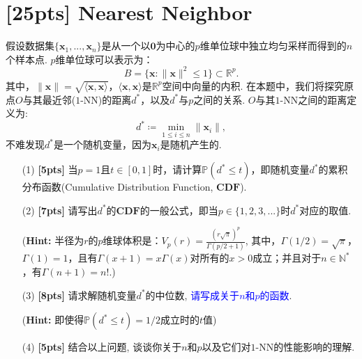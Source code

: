 \documentclass[a4paper,UTF8]{article}
\numberwithin{equation}{section}
\theoremstyle{definition}
\begin{document}
\newpage
\section{[25pts] Nearest Neighbor}
假设数据集$\{\mathbf{x}_1,...,\mathbf{x}_n\}$是从一个以$\mathbf{0}$为中心的$p$维单位球中独立均匀采样而得到的$n$个样本点. $p$维单位球可以表示为：
\begin{equation}
	B = \{\mathbf{x}: \lVert \mathbf{x} \rVert^2 \leq 1\} \subset \mathbb{R}^p.
\end{equation}
其中，$\lVert \mathbf{x} \rVert= \sqrt{\langle\mathbf{x}, \mathbf{x}\rangle}$，$\langle\mathbf{x}, \mathbf{x}\rangle$是$\mathbb{R}^p$空间中向量的内积.
在本题中，我们将探究原点$O$与其最近邻($1$-NN)的距离$d^*$，以及$d^*$与$p$之间的关系. $O$与其$1$-NN之间的距离定义为:
\begin{equation}
d^* \coloneqq \min_{1\leq i \leq n} \lVert \mathbf{x}_i \rVert,
\end{equation}
不难发现$d^*$是一个随机变量，因为$\mathbf{x}_i$是随机产生的.
\begin{enumerate}
\item[(1)] \textbf{[5pts]} 当$p=1$且$t\in [0,1]$时，请计算$\mathbb{P}(d^*\leq t)$，即随机变量$d^*$的累积分布函数(Cumulative Distribution Function, $\mathbf{CDF}$).
\item[(2)] \textbf{[7pts]} 请写出$d^*$的$\mathbf{CDF}$的一般公式，即当$p\in\{1,2,3,...\}$时$d^*$对应的取值. 

(\textbf{Hint:} 半径为$r$的$p$维球体积是：$V_p(r)=\frac{(r\sqrt{\pi})^p}{\Gamma(p/2+1)}$, 
	其中，$\Gamma(1/2)=\sqrt{\pi}$，$\Gamma(1)=1$，且有$\Gamma(x+1)=x\Gamma(x)$对所有的$x>0$成立；并且对于$n\in\mathbb{N}^*$，有$\Gamma(n+1)=n!$.)
\item[(3)] \textbf{[8pts]} 请求解随机变量$d^*$的中位数,  \textcolor{blue}{请写成关于$n$和$p$的函数}.

(\textbf{Hint:} 即使得$\mathbb{P}(d^*\leq t)=1/2$成立时的$t$值)
\item[(4)] \textbf{[5pts]} 结合以上问题, 谈谈你关于$n$和$p$以及它们对$1$-NN的性能影响的理解.
\end{enumerate}
\end{document}
